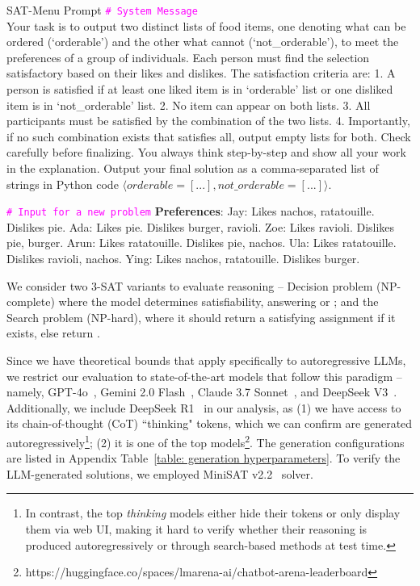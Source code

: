 \documentclass{article} %
\begin{document}
\begin{mybox}[label=table: sat-menu example teaser]{SAT-Menu Prompt}
\footnotesize
\textcolor{magenta}{\texttt{\# System Message}}\\
Your task is to output two distinct lists of food items, one denoting what can be ordered (`orderable') and the other what cannot (`not\_orderable'), to meet the preferences of a group of individuals. Each person must find the selection satisfactory based on their likes and dislikes. The satisfaction criteria are: 1. A person is satisfied if at least one liked item is in `orderable' list or one disliked item is in `not\_orderable' list. 2. No item can appear on both lists. 3. All participants must be satisfied by the combination of the two lists. 4. Importantly, if no such combination exists that satisfies all, output empty lists for both. Check carefully before finalizing. You always think step-by-step and show all your work in the explanation. Output your final solution as a comma-separated list of strings in Python code $\langle orderable=[...], not\_orderable=[...]\rangle$.\newline

\textcolor{magenta}{\texttt{\# Input for a new problem}}\newline
\textbf{Preferences}: Jay: Likes nachos, ratatouille. Dislikes pie. Ada: Likes pie. Dislikes burger, ravioli. Zoe: Likes ravioli. Dislikes pie, burger. Arun: Likes ratatouille. Dislikes pie, nachos. Ula: Likes ratatouille. Dislikes ravioli, nachos. Ying: Likes nachos, ratatouille. Dislikes burger.%
\end{mybox}

We consider two 3-SAT variants to evaluate reasoning -- Decision problem (NP-complete) where the model determines satisfiability, answering  or ; and the Search problem (NP-hard), where it should return a satisfying assignment if it exists, else return .

Since we have theoretical bounds that apply specifically to autoregressive LLMs, we restrict our evaluation to state-of-the-art models that follow this paradigm -- namely, GPT-4o~\citep{gpt_4o}, Gemini 2.0 Flash~\citep{gemini_20_flash}, Claude 3.7 Sonnet~\citep{claude_37_sonnet}, and DeepSeek V3~\citep{deepseek_v3}. Additionally, we include DeepSeek R1~\citep{deepseek_r1} in our analysis, as (1) we have access to its chain-of-thought (CoT) ``thinking" tokens, which we can confirm are generated autoregressively\footnote{In contrast, the top \emph{thinking} models either hide their tokens or only display them via web UI, making it hard to verify whether their reasoning is produced autoregressively or through search-based methods at test time.}; (2) it is one of the top models\footnote{https://huggingface.co/spaces/lmarena-ai/chatbot-arena-leaderboard}. The generation configurations are listed in Appendix Table~\ref{table: generation hyperparameters}. To verify the LLM-generated solutions, we employed MiniSAT v2.2~\citep{minisat} solver.
\end{document}
